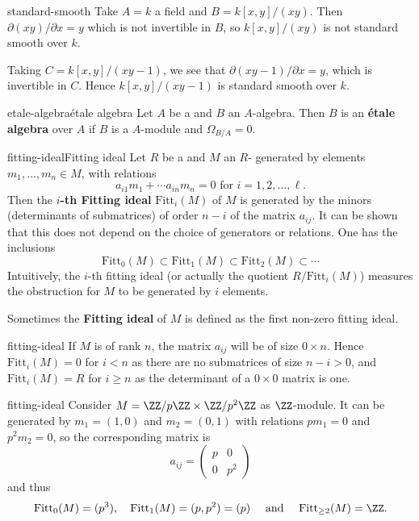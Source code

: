 \begin{example}{standard-smooth}
    Take $A = k$ a field and $B = k[x, y] / (xy)$. Then $\partial (xy) / \partial x = y$ which is not invertible in $B$, so $k[x, y] / (xy)$ is not standard smooth over $k$.
    
    Taking $C = k[x, y] / (xy - 1)$, we see that $\partial (xy - 1) / \partial x = y$, which is invertible in $C$. Hence $k[x, y] / (xy - 1)$ is standard smooth over $k$.
\end{example}

\begin{topic}{etale-algebra}{étale algebra}
    Let $A$ be a  and $B$ an $A$-algebra. Then $B$ is an \textbf{étale algebra} over $A$ if $B$ is a  $A$-module and $\Omega_{B/A} = 0$.
\end{topic}

\begin{topic}{fitting-ideal}{Fitting ideal}
    Let $R$ be a  and $M$ an $R$- generated by elements $m_1, \ldots, m_n \in M$, with relations
    \[ a_{i1} m_1 + \cdots a_{in} m_n = 0 \text{ for } i = 1, 2, \ldots, \ell . \]
    Then the \textbf{$i$-th Fitting ideal} $\text{Fitt}_i(M)$ of $M$ is generated by the minors (determinants of submatrices) of order $n - i$ of the matrix $a_{ij}$. It can be shown that this does not depend on the choice of generators or relations. One has the inclusions
    \[ \text{Fitt}_0(M) \subset \text{Fitt}_1(M) \subset \text{Fitt}_2(M) \subset \cdots \]
    Intuitively, the $i$-th fitting ideal (or actually the quotient $R / \text{Fitt}_i(M)$) measures the obstruction for $M$ to be generated by $i$ elements.
    
    Sometimes the \textbf{Fitting ideal} of $M$ is defined as the first non-zero fitting ideal.
\end{topic}

\begin{example}{fitting-ideal}
    If $M$ is  of rank $n$, the matrix $a_{ij}$ will be of size $0 \times n$. Hence $\text{Fitt}_i(M) = 0$ for $i < n$ as there are no submatrices of size $n - i > 0$, and $\text{Fitt}_i(M) = R$ for $i \ge n$ as the determinant of a $0 \times 0$ matrix is one.
\end{example}

\begin{example}{fitting-ideal}
    Consider $M = \ZZ / p \ZZ \times \ZZ / p^2 \ZZ$ as $\ZZ$-module. It can be generated by $m_1 = (1, 0)$ and $m_2 = (0, 1)$ with relations $p m_1 = 0$ and $p^2 m_2 = 0$, so the corresponding matrix is
    \[ a_{ij} = \begin{pmatrix} p & 0 \\ 0 & p^2 \end{pmatrix} \]
    and thus
    \[ \text{Fitt}_0(M) = (p^3), \quad \text{Fitt}_1(M) = (p, p^2) = (p) \quad \text{ and } \quad \text{Fitt}_{\ge 2}(M) = \ZZ . \]
\end{example}

